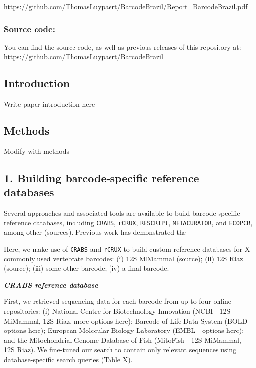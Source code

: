 \documentclass[
  letterpaper,
  DIV=11,
  numbers=noendperiod]{scrartcl}
\begin{document}
\href{https://github.com/ThomasLuypaert/BarcodeBrazil}{https://github.com/ThomasLuypaert/BarcodeBrazil/Report\_BarcodeBrazil.pdf}

\subsubsection{Source code:}\label{source-code}

You can find the source code, as well as previous releases of this
repository at: \url{https://github.com/ThomasLuypaert/BarcodeBrazil}

\subsection{Introduction}\label{introduction}

Write paper introduction here

\subsection{Methods}\label{methods}

Modify with methods

\subsection{1. Building barcode-specific reference
databases}\label{building-barcode-specific-reference-databases}

Several approaches and associated tools are available to build
barcode-specific reference databases, including \texttt{CRABS},
\texttt{rCRUX}, \texttt{RESCRIPt}, \texttt{METACURATOR}, and
\texttt{ECOPCR}, among other (sources). Previous work has demonstrated
the

Here, we make use of \texttt{CRABS} and \texttt{rCRUX} to build custom
reference databases for X commonly used vertebrate barcodes: (i) 12S
MiMammal (source); (ii) 12S Riaz (source); (iii) some other barcode;
(iv) a final barcode.

\textbf{\emph{CRABS reference database}}

First, we retrieved sequencing data for each barcode from up to four
online repositories: (i) National Centre for Biotechnology Innovation
(NCBI - 12S MiMammal, 12S Riaz, more options here); Barcode of Life Data
System (BOLD - options here); European Molecular Biology Laboratory
(EMBL - options here); and the Mitochondrial Genome Database of Fish
(MitoFish - 12S MiMammal, 12S Riaz). We fine-tuned our search to contain
only relevant sequences using database-specific search queries (Table
X).
\end{document}
